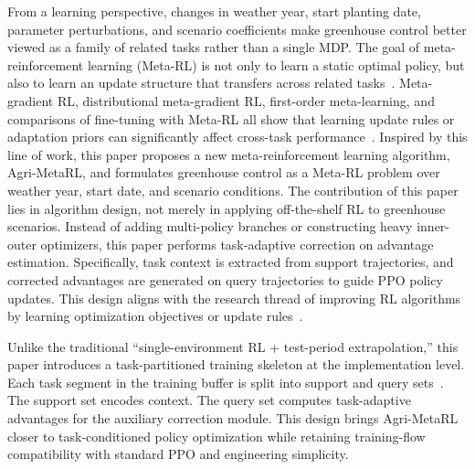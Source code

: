 \documentclass[number,preprint,review,12pt]{elsarticle}
\begin{document}
From a learning perspective, changes in weather year, start planting date, parameter perturbations, and scenario coefficients make greenhouse control better viewed as a family of related tasks rather than a single MDP. The goal of meta-reinforcement learning (Meta-RL) is not only to learn a static optimal policy, but also to learn an update structure that transfers across related tasks~\cite{finn2017maml,duan2016rl2,wang2020survey,ravi2017optimization}. Meta-gradient RL, distributional meta-gradient RL, first-order meta-learning, and comparisons of fine-tuning with Meta-RL all show that learning update rules or adaptation priors can significantly affect cross-task performance~\cite{xu2020meta,yin2023distributional,zhao2022effectiveness,nichol2018reptile}. Inspired by this line of work, this paper proposes a new meta-reinforcement learning algorithm, Agri-MetaRL, and formulates greenhouse control as a Meta-RL problem over weather year, start date, and scenario conditions. The contribution of this paper lies in algorithm design, not merely in applying off-the-shelf RL to greenhouse scenarios. Instead of adding multi-policy branches or constructing heavy inner-outer optimizers, this paper performs task-adaptive correction on advantage estimation. Specifically, task context is extracted from support trajectories, and corrected advantages are generated on query trajectories to guide PPO policy updates. This design aligns with the research thread of improving RL algorithms by learning optimization objectives or update rules~\cite{lu2022discovered,oh2025discovering}.

Unlike the traditional ``single-environment RL + test-period extrapolation,'' this paper introduces a task-partitioned training skeleton at the implementation level. Each task segment in the training buffer is split into support and query sets~\cite{vinyals2016matching,snell2017prototypical,rakelly2019pearl}. The support set encodes context. The query set computes task-adaptive advantages for the auxiliary correction module. This design brings Agri-MetaRL closer to task-conditioned policy optimization while retaining training-flow compatibility with standard PPO and engineering simplicity.
\end{document}
